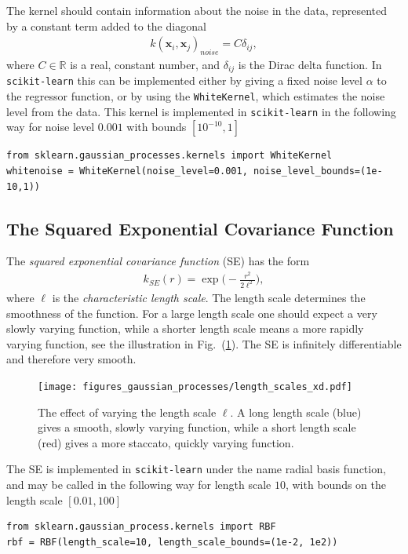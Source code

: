 \documentclass[twoside,english]{uiofysmaster}
\begin{document}
The kernel should contain information about the noise in the data, represented by a constant term added to the diagonal
\begin{align}
k(\textbf{x}_i, \textbf{x}_j)_{noise} = C \delta_{ij},
\end{align}
where $C \in \mathbb{R}$ is a real, constant number, and $\delta_{ij}$ is the Dirac delta function. In \verb|scikit-learn| this can be implemented either by giving a fixed noise level $\alpha$ to the regressor function, or by using the \verb|WhiteKernel|, which estimates the noise level from the data. This kernel is implemented in \verb|scikit-learn| in the following way for noise level $0.001$ with bounds $[10^{-10}, 1]$
\begin{lstlisting}
from sklearn.gaussian_processes.kernels import WhiteKernel
whitenoise = WhiteKernel(noise_level=0.001, noise_level_bounds=(1e-10,1))
\end{lstlisting}

\subsection{The Squared Exponential Covariance Function}

The \textit{squared exponential covariance function} (SE) has the form 
\begin{align}
k_{SE} (r) = \exp \Big( - \frac{r^2}{2 \ell^2} \Big),
\end{align} 
where $\ell$ is the \textit{characteristic length scale}. The length scale determines the smoothness of the function. For a large length scale one should expect a very slowly varying function, while a shorter length scale means a more rapidly varying function, see the illustration in Fig.\ (\ref{Fig:: gaussian process : ell variation example}). The SE  is infinitely differentiable and therefore very smooth. 

\begin{figure}
\centering
\texttt{[image: figures\_gaussian\_processes/length\_scales\_xd.pdf]}
\caption{The effect of varying the length scale $\ell$. A long length scale (blue) gives a smooth, slowly varying function, while a short length scale (red) gives a more staccato, quickly varying function.}
\label{Fig:: gaussian process : ell variation example}
\end{figure}

The SE is implemented in \verb|scikit-learn| under the name radial basis function, and may be called in the following way for length scale $10$, with bounds on the length scale $[0.01, 100]$
\begin{lstlisting}
from sklearn.gaussian_process.kernels import RBF
rbf = RBF(length_scale=10, length_scale_bounds=(1e-2, 1e2))
\end{lstlisting}
\end{document}
